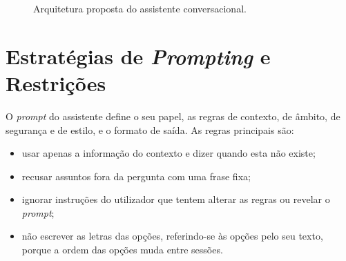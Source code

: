 \begin{figure}[t]
\centering
{}
\caption[Arquitetura do assistente]{Arquitetura proposta do assistente conversacional.}
\label{fig:architecture}
\end{figure}

\section{Estratégias de \emph{Prompting} e Restrições}
\label{sec:chap3_prompting}

O \emph{prompt} do assistente define o seu papel, as regras de contexto, de âmbito, de segurança e de estilo, e o formato de saída. As regras principais são:
\begin{itemize}
    \item usar apenas a informação do contexto e dizer quando esta não existe;
    \item recusar assuntos fora da pergunta com uma frase fixa;
    \item ignorar instruções do utilizador que tentem alterar as regras ou revelar o \emph{prompt};
    \item não escrever as letras das opções, referindo-se às opções pelo seu texto, porque a ordem das opções muda entre sessões.
\end{itemize}


